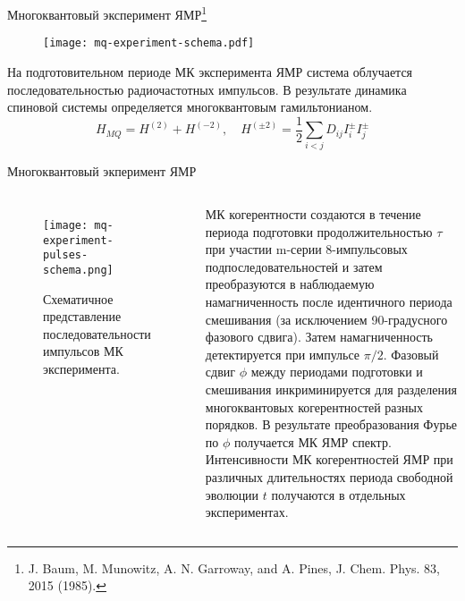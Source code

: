 \begin{frame}{Многоквантовый эксперимент ЯМР\footnote[frame]{
J. Baum, M. Munowitz, A. N. Garroway, and A. Pines, J. Chem. Phys. 83, 2015 (1985).}}

  \begin{figure}
    \texttt{[image: mq-experiment-schema.pdf]}
  \end{figure}
  \vspace{-3mm}
  \begin{block}{}
    На подготовительном периоде МК эксперимента ЯМР система облучается последовательностью радиочастотных импульсов. В результате динамика спиновой системы определяется многоквантовым гамильтонианом.
    $$
    H_{MQ} = H^{(2)} + H^{(-2)},
    \quad H^{(\pm2)} = \frac 1 2 \sum_{i < j} D_{ij} I^\pm_i I^\pm_j
    $$
  \end{block}
\end{frame}

\begin{frame}{Многоквантовый экперимент ЯМР}
  \begin{columns}

    \begin{figure}
      \texttt{[image: mq-experiment-pulses-schema.png]}
      \caption{Схематичное представление последовательности импульсов МК эксперимента.}
    \end{figure}


    МК когерентности создаются в течение периода подготовки продолжительностью $\tau$ при участии m-серии 8-импульсовых подпоследовательностей и затем преобразуются в наблюдаемую намагниченность после идентичного периода смешивания (за исключением 90-градусного фазового сдвига). Затем намагниченность детектируется при импульсе $\pi/2$. Фазовый сдвиг $\phi$ между периодами подготовки и смешивания инкриминируется для разделения многоквантовых когерентностей разных порядков. В результате преобразования Фурье по $\phi$ получается МК ЯМР спектр. Интенсивности МК когерентностей ЯМР при различных длительностях периода свободной эволюции $t$ получаются в отдельных экспериментах.
  \end{columns}
\end{frame}